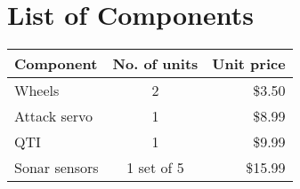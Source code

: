 \documentclass[11pt, letterpaper, oneside]{article}
\begin{document}
\newpage
\section{List of Components}
\begin{table}[tbh]
	\label{tab:components}
	\begin{center}
		\begin{tabular}{|l|c|r|}
			\hline
			Component 		& 	No. of units	&	Unit price 	\\ 	\hline 
			Wheels	 		& 	2 				&	\$3.50 		\\
			Attack servo	&	1 				&	\$8.99 		\\
			QTI				&	1				&	\$9.99		\\
			Sonar sensors	&	1 set of 5		&	\$15.99		\\	\hline 
		\end{tabular}
	\end{center}
\end{table} 

\newpage
\end{document}
